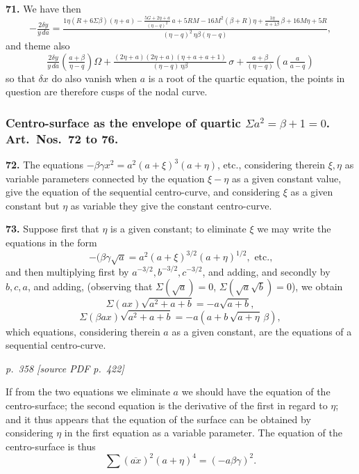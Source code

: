 \documentclass[11pt,a4paper]{article}
\newcommand{\pagemarker}[2]{\par\bigskip\noindent\textit{p.~#1 [source PDF p.~#2]}\par\smallskip}
\begin{document}
\textbf{71.} We have then
\[
-\tfrac{2\delta y}{y\,da} = \tfrac{1\eta(R + 6\Sigma\beta)(\eta + a) - \tfrac{5G + 2\eta + a}{(\eta - q)^2}\,a + 5RM - 16M^2(\beta + R)\eta + \tfrac{1\eta}{a + 1\beta}\,\beta + 16M\eta + 5R}{(\eta - q)^2\,\eta\beta(\eta - q)},
\]
and theme also
\[
\tfrac{2\delta y}{y\,da}\!\!\left(\tfrac{a + \beta}{\eta - q}\!\right)\Omega + \tfrac{(2\eta + a)(2\eta + a)(\eta + a + a + 1)}{(\eta - q)\,\eta\beta}\,\sigma + \tfrac{a + \beta}{(\eta - q)}\!\left(a\,\tfrac{a}{a - q}\right)
\]
so that $\delta x$ do also vanish when $a$ is a root of the quartic equation, the points in question are therefore cusps of the nodal curve.

\subsubsection*{Centro-surface as the envelope of quartic $\Sigma a^2 = \beta + 1 = 0$. Art.\ Nos.\ 72 to 76.}

\textbf{72.} The equations $-\beta\gamma x^2 = a^2(a + \xi)^3(a + \eta)$, etc., considering therein $\xi, \eta$ as variable parameters connected by the equation $\xi - \eta$ as a given constant value, give the equation of the sequential centro-curve, and considering $\xi$ as a given constant but $\eta$ as variable they give the constant centro-curve.

\textbf{73.} Suppose first that $\eta$ is a given constant; to eliminate $\xi$ we may write the equations in the form
\[
-(\beta\gamma\sqrt{a} = a^2(a + \xi)^{3/2}(a + \eta)^{1/2},\text{ etc.,}
\]
and then multiplying first by $a^{-3/2}, b^{-3/2}, c^{-3/2}$, and adding, and secondly by $b, c, a$, and adding, (observing that $\Sigma\!\left(\sqrt{a}\right) = 0$, $\Sigma(\sqrt{a}\sqrt{b}) = 0$), we obtain
\[
\Sigma(a x)\sqrt{a^2 + a + b} = -a\sqrt{a + b},
\]
\[
\Sigma(\beta a x)\sqrt{a^2 + a + b} = -a(a + b\,\sqrt{a + \eta}\,\beta),
\]
which equations, considering therein $a$ as a given constant, are the equations of a sequential centro-curve.

\clearpage

\bigskip
\pagemarker{358}{422}
\smallskip

If from the two equations we eliminate $a$ we should have the equation of the centro-surface; the second equation is the derivative of the first in regard to $\eta$; and it thus appears that the equation of the surface can be obtained by considering $\eta$ in the first equation as a variable parameter. The equation of the centro-surface is thus
\[
\sum (\overline{a x})^2 (a + \eta)^4 = (- a \beta \gamma)^2.
\]
\end{document}
